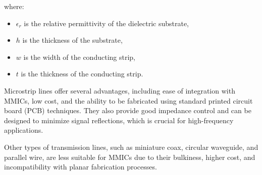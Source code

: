 where:
\begin{itemize}
    \item \( \epsilon_r \) is the relative permittivity of the dielectric substrate,
    \item \( h \) is the thickness of the substrate,
    \item \( w \) is the width of the conducting strip,
    \item \( t \) is the thickness of the conducting strip.
\end{itemize}

Microstrip lines offer several advantages, including ease of integration with MMICs, low cost, and the ability to be fabricated using standard printed circuit board (PCB) techniques. They also provide good impedance control and can be designed to minimize signal reflections, which is crucial for high-frequency applications.

Other types of transmission lines, such as miniature coax, circular waveguide, and parallel wire, are less suitable for MMICs due to their bulkiness, higher cost, and incompatibility with planar fabrication processes.

